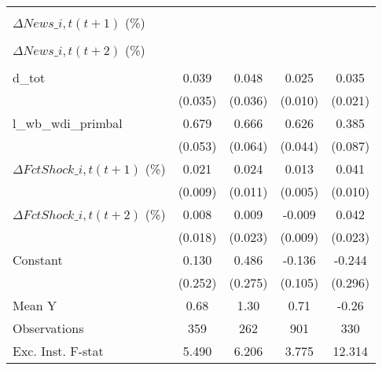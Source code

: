 {\begin{tabular}{l*{4}{c}}
                    &                     &                     &                     &                     \\
\addlinespace
$ \Delta News\_{i,t}(t+1)$ (\%)&                     &                     &                     &                     \\
                    &                     &                     &                     &                     \\
\addlinespace
$ \Delta News\_{i,t}(t+2)$ (\%)&                     &                     &                     &                     \\
                    &                     &                     &                     &                     \\
\addlinespace
d\_tot               &       0.039         &       0.048         &       0.025\sym{**} &       0.035         \\
                    &     (0.035)         &     (0.036)         &     (0.010)         &     (0.021)         \\
\addlinespace
l\_wb\_wdi\_primbal    &       0.679\sym{***}&       0.666\sym{***}&       0.626\sym{***}&       0.385\sym{***}\\
                    &     (0.053)         &     (0.064)         &     (0.044)         &     (0.087)         \\
\addlinespace
$ \Delta FctShock\_{i,t}(t+1)$ (\%)&       0.021\sym{**} &       0.024\sym{**} &       0.013\sym{***}&       0.041\sym{***}\\
                    &     (0.009)         &     (0.011)         &     (0.005)         &     (0.010)         \\
\addlinespace
$ \Delta FctShock\_{i,t}(t+2)$ (\%)&       0.008         &       0.009         &      -0.009         &       0.042\sym{*}  \\
                    &     (0.018)         &     (0.023)         &     (0.009)         &     (0.023)         \\
\addlinespace
Constant            &       0.130         &       0.486\sym{*}  &      -0.136         &      -0.244         \\
                    &     (0.252)         &     (0.275)         &     (0.105)         &     (0.296)         \\
\midrule
Mean Y              &        0.68         &        1.30         &        0.71         &       -0.26         \\
Observations        &         359         &         262         &         901         &         330         \\
Exc. Inst. F-stat   &       5.490         &       6.206         &       3.775         &      12.314         \\
\bottomrule
\end{tabular}
}
